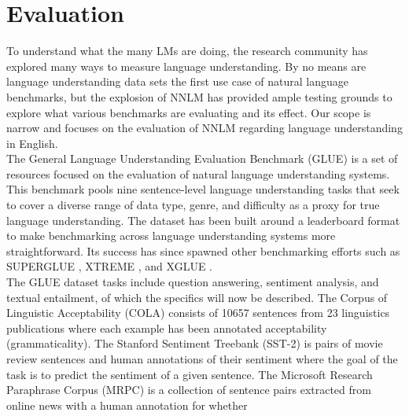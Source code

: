 \section{Evaluation}
\label{chap:prior:sec:eval}
To understand what the many LMs are doing, the research community has explored many ways to measure language understanding. By no means are language understanding data sets the first use case of natural language benchmarks, but the explosion of NNLM has provided ample testing grounds to explore what various benchmarks are evaluating and its effect. Our scope is narrow and focuses on the evaluation of NNLM regarding language understanding in English. \\
The General Language Understanding Evaluation Benchmark (GLUE) \cite{Wang2018GLUEAM} is a set of resources focused on the evaluation of natural language understanding systems. This benchmark pools nine sentence-level language understanding tasks that seek to cover a diverse range of data type, genre, and difficulty as a proxy for true language understanding. The dataset has been built around a leaderboard format to make benchmarking across language understanding systems more straightforward. Its success has since spawned other benchmarking efforts such as SUPERGLUE \cite{Wang2019SuperGLUEAS}, XTREME \cite{Hu2020XTREMEAM}, and XGLUE \cite{Liang2020XGLUEAN}. \\
The GLUE dataset tasks include question answering, sentiment analysis, and textual entailment, of which the specifics will now be described. The Corpus of Linguistic Acceptability (COLA) \cite{Warstadt2019NeuralNA} consists of 10657 sentences from 23 linguistics publications where each example has been annotated acceptability (grammaticality). The Stanford Sentiment Treebank (SST-2) \cite{Socher2013RecursiveDM} is pairs of movie review sentences and human annotations of their sentiment where the goal of the task is to predict the sentiment of a given
sentence. The Microsoft Research Paraphrase Corpus (MRPC) \cite{Dolan2005AutomaticallyCA} is a collection of sentence pairs extracted from online news with a human annotation for whether
